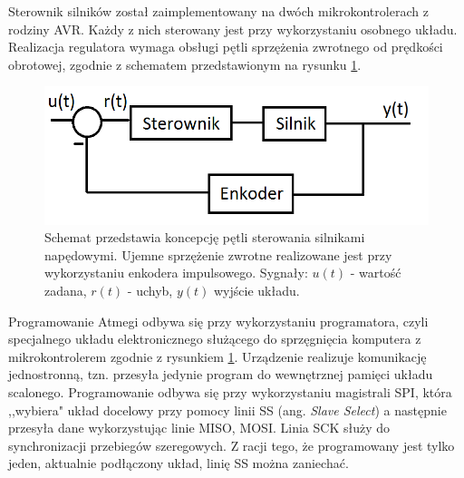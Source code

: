 Sterownik silników został zaimplementowany na dwóch mikrokontrolerach z rodziny AVR. Każdy z nich sterowany jest przy wykorzystaniu osobnego układu. Realizacja regulatora wymaga obsługi pętli sprzężenia zwrotnego od prędkości obrotowej, zgodnie z schematem przedstawionym na rysunku \ref{schem_ster}. 

  \begin{figure}[H]
    \begin{center}
      \includegraphics[scale=0.45]{imgs/sterowanie.png}
 	\caption[Schemat pętli sterowania silnikami.]{\small{Schemat przedstawia koncepcję pętli sterowania silnikami napędowymi. Ujemne sprzężenie zwrotne realizowane jest przy wykorzystaniu enkodera impulsowego. Sygnały: $u(t)$ - wartość zadana, $r(t)$ - uchyb, $y(t)$ wyjście układu.}}
	\label{schem_ster}
    \end{center}
  \end{figure}  
  
Programowanie Atmegi odbywa się przy wykorzystaniu programatora, czyli specjalnego układu elektronicznego służącego do sprzęgnięcia komputera z mikrokontrolerem zgodnie z rysunkiem \ref{schem_ster}. Urządzenie realizuje komunikację jednostronną, tzn. przesyła jedynie program do wewnętrznej pamięci układu scalonego.  Programowanie odbywa się przy wykorzystaniu magistrali SPI, która ,,wybiera" układ docelowy przy pomocy linii SS (ang. \textit{Slave Select}) a następnie przesyła dane wykorzystując linie MISO, MOSI. Linia SCK służy do synchronizacji przebiegów szeregowych. Z racji tego, że programowany jest tylko jeden, aktualnie podłączony układ, linię SS można zaniechać.

